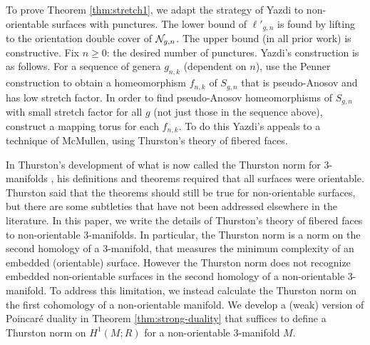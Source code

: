 

 To prove Theorem \ref{thm:stretch1}, we adapt the strategy of Yazdi \cite{yazdi2018pseudo} to non-orientable surfaces with punctures.  The lower bound of $\ell'_{g,n}$ is found by lifting to the orientation double cover of $\mathcal{N}_{g,n}$.  The upper bound (in all prior work) is constructive.  Fix $n\geq 0$: the desired number of punctures.  Yazdi's construction is as follows.  For a sequence of genera $g_{n,k}$ (dependent on $n$), use the Penner construction \cite{penner1988construction} to obtain a homeomorphism $f_{n,k}$ of $S_{g,n}$ that is pseudo-Anosov and has low stretch factor.  In order to find pseudo-Anosov homeomorphisms of $S_{g,n}$ with small stretch factor for all $g$ (not just those in the sequence above), construct a mapping torus for each $f_{n,k}$.  To do this Yazdi's appeals to a technique of McMullen, using Thurston's theory of fibered faces.  %

 In Thurston's development of what is now called the Thurston norm for 3-manifolds \cite{thurston1986norm}, his definitions and theorems required that all surfaces were orientable.  Thurston said that the theorems should still be true for non-orientable surfaces, but there are some subtleties that have not been addressed elsewhere in the literature.  In this paper, we write the details of Thurston's theory of fibered faces to non-orientable 3-manifolds.  In particular, the Thurston norm is a norm on the second homology of a 3-manifold, that measures the minimum complexity of an embedded (orientable) surface. However the Thurston norm does not recognize embedded non-orientable surfaces in the second homology of a non-orientable 3-manifold.  To address this limitation, we instead calculate the Thurston norm on the first cohomology of a non-orientable manifold.  We develop a (weak) version of Poincar\'e duality in Theorem \ref{thm:strong-duality} that suffices to define a Thurston norm on $H^1(M;R)$ for a non-orientable 3-manifold $M$.

